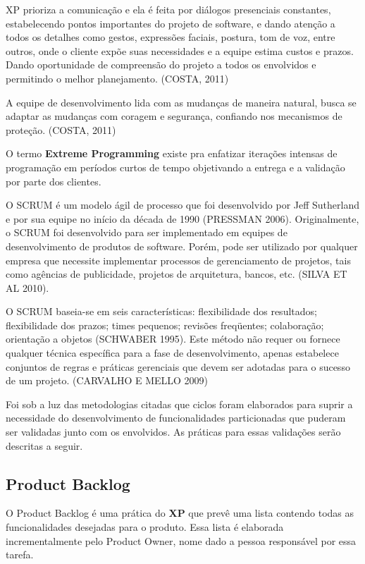 XP prioriza a comunicação e ela é feita por diálogos presenciais constantes, estabelecendo pontos importantes do projeto de software, e dando atenção a todos os detalhes como gestos, expressões faciais, postura, tom de voz, entre outros, onde o cliente expõe suas necessidades e a equipe estima custos e prazos. Dando oportunidade de compreensão do projeto a todos os envolvidos e permitindo o melhor planejamento. (COSTA, 2011) 

A equipe de desenvolvimento lida com as mudanças de maneira natural, busca se adaptar as mudanças com coragem e segurança, confiando nos mecanismos de proteção. (COSTA, 2011) 

O termo \textbf{Extreme Programming} existe pra enfatizar iterações intensas de programação em períodos curtos de tempo objetivando a entrega e a validação por parte dos clientes.

O SCRUM é um modelo ágil de processo que foi desenvolvido por Jeff Sutherland e por sua equipe no início da década de 1990 (PRESSMAN 2006). Originalmente, o SCRUM foi desenvolvido para ser implementado em equipes de desenvolvimento de produtos de software. Porém, pode ser utilizado por qualquer empresa que necessite implementar processos de gerenciamento de projetos, tais como agências de publicidade, projetos de arquitetura, bancos, etc. (SILVA ET AL 2010).

O SCRUM baseia-se em seis características: flexibilidade dos resultados; flexibilidade dos prazos; times pequenos; revisões freqüentes; colaboração; orientação a objetos (SCHWABER 1995). Este método não requer ou fornece qualquer técnica específica para a fase de desenvolvimento, apenas estabelece conjuntos de regras e práticas gerenciais que devem ser adotadas para o sucesso de um projeto. (CARVALHO E MELLO 2009)

Foi sob a luz das metodologias citadas que ciclos foram elaborados para suprir a necessidade do desenvolvimento de funcionalidades particionadas que puderam ser validadas junto com os envolvidos. As práticas para essas validações serão descritas a seguir.

\subsection{Product Backlog}

O Product Backlog é uma prática do \textbf{XP} que prevê uma lista contendo todas as funcionalidades desejadas para o produto. Essa lista é elaborada incrementalmente pelo Product Owner, nome dado a pessoa responsável por essa tarefa.

